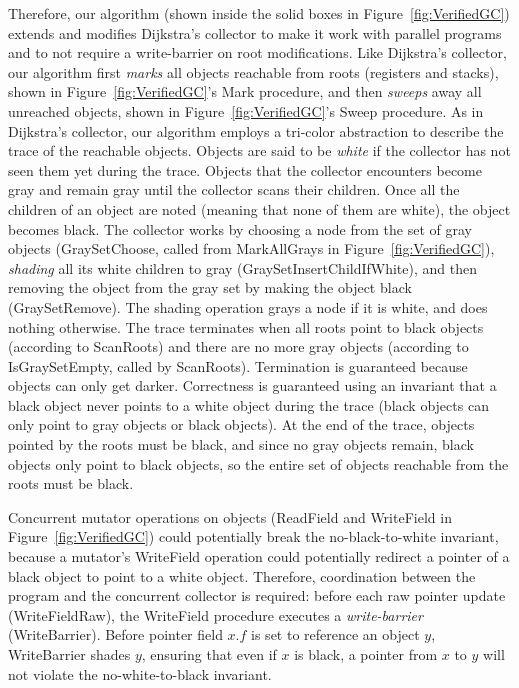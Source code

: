 Therefore, our algorithm (shown inside the solid boxes in Figure~\ref{fig:VerifiedGC}) extends and modifies Dijkstra's collector
to make it work with parallel programs and to not require a write-barrier on root modifications.
Like Dijkstra's collector, our algorithm first {\em marks} all objects reachable from roots (registers and stacks),
shown in Figure~\ref{fig:VerifiedGC}'s Mark procedure, and then {\em sweeps} away all unreached objects,
shown in Figure~\ref{fig:VerifiedGC}'s Sweep procedure.
As in Dijkstra's collector, our algorithm employs a tri-color abstraction to describe the trace of the reachable objects.
Objects are said to be {\em white} if the collector has not seen them yet during the trace.
Objects that the collector encounters become gray and remain gray until the collector scans their children.
Once all the children of an object are noted (meaning that none of them are white), the object becomes black.
The collector works by choosing a node from the set of gray objects (GraySetChoose, called from MarkAllGrays in Figure~\ref{fig:VerifiedGC}),
{\em shading} all its white children to gray (GraySetInsertChildIfWhite), and then removing the object from the gray set by making the object black (GraySetRemove).
The shading operation grays a node if it is white, and does nothing otherwise.
The trace terminates when all roots point to black objects (according to ScanRoots)
and there are no more gray objects (according to IsGraySetEmpty, called by ScanRoots).
Termination is guaranteed because objects can only get darker.
Correctness is guaranteed using an invariant that a black object never points to a white object during the trace
(black objects can only point to gray objects or black objects).
At the end of the trace, objects pointed by the roots must be black, and since no gray objects remain,
black objects only point to black objects,
so the entire set of objects reachable from the roots must be black.

Concurrent mutator operations on objects (ReadField and WriteField in Figure~\ref{fig:VerifiedGC})
could potentially break the no-black-to-white invariant,
because a mutator's WriteField operation could potentially redirect a pointer of a black object to point to a white object.
Therefore, coordination between the program and the concurrent collector is required:
before each raw pointer update (WriteFieldRaw), the WriteField procedure executes a {\em write-barrier} (WriteBarrier).
Before pointer field $x.f$ is set to reference an object $y$,
WriteBarrier shades $y$, ensuring that even if $x$ is black, a pointer from $x$ to $y$
will not violate the no-white-to-black invariant.

